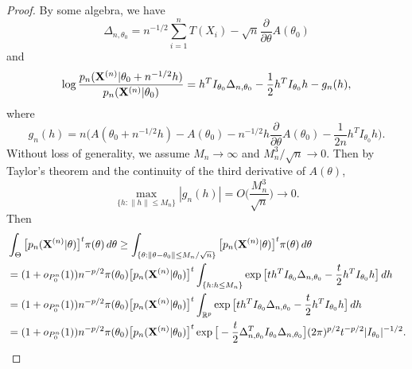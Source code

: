 \documentclass[3p]{elsarticle}
\theoremstyle{plain}
\theoremstyle{definition}
\theoremstyle{remark}
\begin{document}
\begin{proof}
    By some algebra, we have
    $$
    \Delta_{n,\theta_0}=n^{-1/2}\sum_{i=1}^n T(X_i)-\sqrt{n}\frac{\partial}{\partial \theta} A(\theta_0)
    $$
    and
    $$
    \log\frac{p_n(\mathbf{X}^{(n)}|\theta_0+n^{-1/2}h)}{p_n(\mathbf{X}^{(n)}|\theta_0)}
    =h^T I_{\theta_0} \Delta_{n,\theta_0}-\frac{1}{2} h^T I_{\theta_0} h-
    g_n(h),
    $$
    where
    $$
    g_n(h)=n\Big(A(\theta_0+n^{-1/2}h)-A(\theta_0)-n^{-1/2}h \frac{\partial}{\partial \theta}A(\theta_0)-\frac{1}{2n}h^T I_{\theta_0}h\Big).
    $$
    Without loss of generality, we assume $M_n\to \infty$ and $M_n^3/\sqrt{n}\to 0$.
    Then by Taylor's theorem and the continuity of the third derivative of $A(\theta)$, 
    $$
        \max_{\{h:\|h\|\leq M_n\}}|g_n(h)|=O\Big(\frac{M_n^3}{\sqrt{n}}\Big)\to 0.
    $$
    Then
$$
    \begin{aligned}
        &\int_{\Theta} \big[p_n(\mathbf{X}^{(n)}|\theta)\big]^t \pi(\theta)\, d\theta
        \geq
        \int_{\{\theta:\|\theta-\theta_0\|\leq M_n/\sqrt{n}\}} \big[p_n(\mathbf{X}^{(n)}|\theta)\big]^t \pi(\theta)\, d\theta
        \\
        &=
        (1+o_{P_0^n}(1))n^{-p/2}\pi(\theta_0)\big[p_n(\mathbf{X}^{(n)}|\theta_0)\big]^t\int_{\{h:h\leq M_n\}} \exp\big[ t h^T I_{\theta_0}\Delta_{n,\theta_0}-\frac{t}{2}h^T I_{\theta_0}h\big] \, dh
        \\
        &=
        (1+o_{P_0^n}(1))n^{-p/2}\pi(\theta_0) \big[p_n(\mathbf{X}^{(n)}|\theta_0)\big]^t\int_{\mathbb{R}^p} \exp\big[t h^T I_{\theta_0}\Delta_{n,\theta_0}-\frac{t}{2}h^T I_{\theta_0}h\big] \, dh
        \\
        &=
        (1+o_{P_0^n}(1))n^{-p/2}\pi(\theta_0)\big[p_n(\mathbf{X}^{(n)}|\theta_0)\big]^t
        \exp\big[-\frac{t}{2}\Delta_{n,\theta_0}^T I_{\theta_0}\Delta_{n,\theta_0}\big]
        (2\pi)^{p/2} t^{-p/2}  |I_{\theta_0}|^{-1/2}.
    \end{aligned}
$$


\end{proof}
\end{document}
